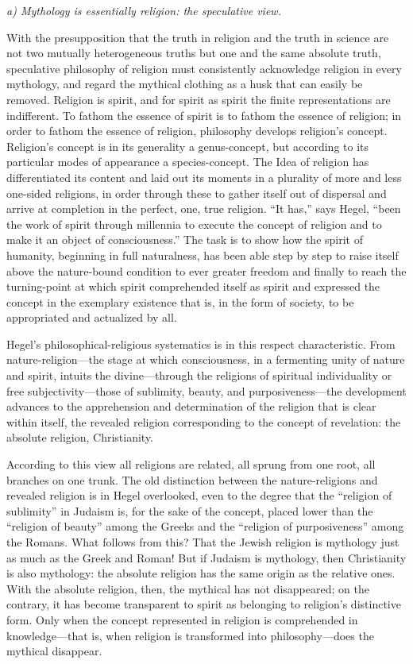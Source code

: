 \documentclass[12pt,a4paper]{article}
\begin{document}
\medskip
\noindent\textit{a) Mythology is essentially religion: the speculative view.}
\medskip

With the presupposition that the truth in religion and the truth
in science are not two mutually heterogeneous truths but one and
the same absolute truth, speculative philosophy of religion must
consistently acknowledge religion in every mythology, and regard
the mythical clothing as a husk that can easily be removed.
Religion is spirit, and for spirit as spirit the finite
representations are indifferent. To fathom the essence of spirit
is to fathom the essence of religion; in order to fathom the
essence of religion, philosophy develops religion's concept.
Religion's concept is in its generality a genus-concept, but
according to its particular modes of appearance a
species-concept. The Idea of religion has differentiated its
content and laid out its moments in a plurality of more and less
one-sided religions, in order through these to gather itself out
of dispersal and arrive at completion in the perfect, one, true
religion. ``It has,'' says Hegel, ``been the work of spirit
through millennia to execute the concept of religion and to make
it an object of consciousness.'' The task is to show how the
spirit of humanity, beginning in full naturalness, has been able
step by step to raise itself above the nature-bound condition to
ever greater freedom and finally to reach the turning-point at
which spirit comprehended itself as spirit and expressed the
concept in the exemplary existence that is, in the form of
society, to be appropriated and actualized by all.

Hegel's philosophical-religious systematics is in this respect
characteristic. From nature-religion---the stage at which
consciousness, in a fermenting unity of nature and spirit,
intuits the divine---through the religions of spiritual
individuality or free subjectivity---those of sublimity, beauty,
and purposiveness---the development advances to the apprehension
and determination of the religion that is clear within itself,
the revealed religion corresponding to the concept of
revelation: the absolute religion, Christianity.

According to this view all religions are related, all sprung from
one root, all branches on one trunk. The old distinction between
the nature-religions and revealed religion is in Hegel
overlooked, even to the degree that the ``religion of sublimity''
in Judaism is, for the sake of the concept, placed lower than the
``religion of beauty'' among the Greeks and the ``religion of
purposiveness'' among the Romans. What follows from this? That
the Jewish religion is mythology just as much as the Greek and
Roman! But if Judaism is mythology, then Christianity is also
mythology: the absolute religion has the same origin as the
relative ones. With the absolute religion, then, the mythical
has not disappeared; on the contrary, it has become transparent
to spirit as belonging to religion's distinctive form. Only when
the concept represented in religion is comprehended in
knowledge---that is, when religion is transformed into
philosophy---does the mythical disappear.
\end{document}
